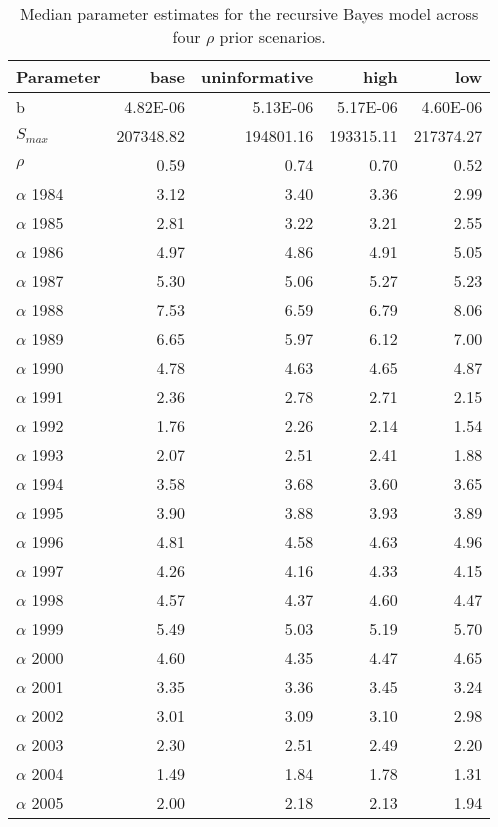 \begin{table}[ht]
\centering
\caption{Median parameter estimates for the recursive Bayes model across four $\rho$ prior scenarios. } 
\begin{tabular}{lrrrr}
  \hline
Parameter & base & uninformative & high & low \\ 
  \hline
b & 4.82E-06 & 5.13E-06 & 5.17E-06 & 4.60E-06 \\ 
  $S_{max}$ & 207348.82 & 194801.16 & 193315.11 & 217374.27 \\ 
  $\rho$ & 0.59 & 0.74 & 0.70 & 0.52 \\ 
  $\alpha$ 1984 & 3.12 & 3.40 & 3.36 & 2.99 \\ 
  $\alpha$ 1985 & 2.81 & 3.22 & 3.21 & 2.55 \\ 
  $\alpha$ 1986 & 4.97 & 4.86 & 4.91 & 5.05 \\ 
  $\alpha$ 1987 & 5.30 & 5.06 & 5.27 & 5.23 \\ 
  $\alpha$ 1988 & 7.53 & 6.59 & 6.79 & 8.06 \\ 
  $\alpha$ 1989 & 6.65 & 5.97 & 6.12 & 7.00 \\ 
  $\alpha$ 1990 & 4.78 & 4.63 & 4.65 & 4.87 \\ 
  $\alpha$ 1991 & 2.36 & 2.78 & 2.71 & 2.15 \\ 
  $\alpha$ 1992 & 1.76 & 2.26 & 2.14 & 1.54 \\ 
  $\alpha$ 1993 & 2.07 & 2.51 & 2.41 & 1.88 \\ 
  $\alpha$ 1994 & 3.58 & 3.68 & 3.60 & 3.65 \\ 
  $\alpha$ 1995 & 3.90 & 3.88 & 3.93 & 3.89 \\ 
  $\alpha$ 1996 & 4.81 & 4.58 & 4.63 & 4.96 \\ 
  $\alpha$ 1997 & 4.26 & 4.16 & 4.33 & 4.15 \\ 
  $\alpha$ 1998 & 4.57 & 4.37 & 4.60 & 4.47 \\ 
  $\alpha$ 1999 & 5.49 & 5.03 & 5.19 & 5.70 \\ 
  $\alpha$ 2000 & 4.60 & 4.35 & 4.47 & 4.65 \\ 
  $\alpha$ 2001 & 3.35 & 3.36 & 3.45 & 3.24 \\ 
  $\alpha$ 2002 & 3.01 & 3.09 & 3.10 & 2.98 \\ 
  $\alpha$ 2003 & 2.30 & 2.51 & 2.49 & 2.20 \\ 
  $\alpha$ 2004 & 1.49 & 1.84 & 1.78 & 1.31 \\ 
  $\alpha$ 2005 & 2.00 & 2.18 & 2.13 & 1.94 \\ 

\end{tabular}
\end{table}
